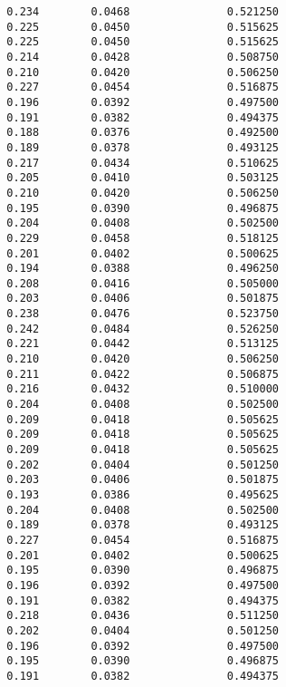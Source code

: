 \documentclass[
  letterpaper,
  DIV=11,
  numbers=noendperiod]{scrartcl}
\begin{document}
\begin{verbatim}
  0.234        0.0468               0.521250              
  0.225        0.0450               0.515625              
  0.225        0.0450               0.515625              
  0.214        0.0428               0.508750              
  0.210        0.0420               0.506250              
  0.227        0.0454               0.516875              
  0.196        0.0392               0.497500              
  0.191        0.0382               0.494375              
  0.188        0.0376               0.492500              
  0.189        0.0378               0.493125              
  0.217        0.0434               0.510625              
  0.205        0.0410               0.503125              
  0.210        0.0420               0.506250              
  0.195        0.0390               0.496875              
  0.204        0.0408               0.502500              
  0.229        0.0458               0.518125              
  0.201        0.0402               0.500625              
  0.194        0.0388               0.496250              
  0.208        0.0416               0.505000              
  0.203        0.0406               0.501875              
  0.238        0.0476               0.523750              
  0.242        0.0484               0.526250              
  0.221        0.0442               0.513125              
  0.210        0.0420               0.506250              
  0.211        0.0422               0.506875              
  0.216        0.0432               0.510000              
  0.204        0.0408               0.502500              
  0.209        0.0418               0.505625              
  0.209        0.0418               0.505625              
  0.209        0.0418               0.505625              
  0.202        0.0404               0.501250              
  0.203        0.0406               0.501875              
  0.193        0.0386               0.495625              
  0.204        0.0408               0.502500              
  0.189        0.0378               0.493125              
  0.227        0.0454               0.516875              
  0.201        0.0402               0.500625              
  0.195        0.0390               0.496875              
  0.196        0.0392               0.497500              
  0.191        0.0382               0.494375              
  0.218        0.0436               0.511250              
  0.202        0.0404               0.501250              
  0.196        0.0392               0.497500              
  0.195        0.0390               0.496875              
  0.191        0.0382               0.494375              

\end{verbatim}
\end{document}
